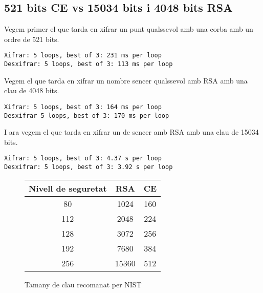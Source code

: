 \documentclass[journal]{IEEEtran}
\begin{document}
\subsection{521 bits CE vs 15034 bits i 4048 bits  RSA  }
Vegem primer el que tarda en xifrar un punt qualssevol amb una corba amb un ordre de 521 bits.
\begin{scriptsize}
\begin{verbatim}
Xifrar: 5 loops, best of 3: 231 ms per loop
Desxifrar: 5 loops, best of 3: 113 ms per loop
\end{verbatim}
\end{scriptsize}
Vegem el que tarda en xifrar un nombre sencer qualssevol amb RSA amb una clau de 4048 bits.
\begin{scriptsize}
\begin{verbatim}
Xifrar: 5 loops, best of 3: 164 ms per loop
Desxifrar 5 loops, best of 3: 170 ms per loop
\end{verbatim}
\end{scriptsize}

I ara vegem el que tarda en xifrar un de sencer amb RSA amb una clau de 15034 bits.
\begin{scriptsize}
\begin{verbatim}
Xifrar: 5 loops, best of 3: 4.37 s per loop
Desxifrar: 5 loops, best of 3: 3.92 s per loop
\end{verbatim}
\end{scriptsize}
\begin{figure}
\begin{center}
\begin{tabular}{|c|c|c|}
 \hline Nivell de seguretat & RSA & CE \\
\hline 80 & 1024 & 160 \\
\hline 112 & 2048 & 224 \\
\hline 128 & 3072 & 256 \\
\hline 192 & 7680 & 384 \\
\hline 256 & 15360 & 512 \\
\hline 
\end{tabular}
\end{center}
\caption{Tamany de clau recomanat per NIST} \label{Taula}
\end{figure} 
\end{document}
